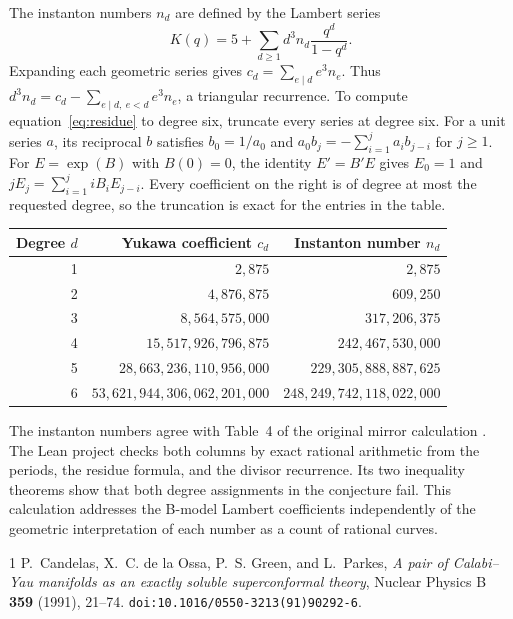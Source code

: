 \documentclass[11pt]{article}
\begin{document}
The instanton numbers \(n_d\) are defined by the Lambert series
\[
 K(q)=5+\sum_{d\ge1}d^3n_d\frac{q^d}{1-q^d}.
\]
Expanding each geometric series gives \(c_d=\sum_{e\mid d}e^3 n_e\).
Thus \(d^3n_d=c_d-\sum_{e\mid d,\ e<d}e^3n_e\), a triangular recurrence.
To compute equation~\eqref{eq:residue} to degree six, truncate every series
at degree six. For a unit series \(a\), its reciprocal \(b\) satisfies
\(b_0=1/a_0\) and \(a_0b_j=-\sum_{i=1}^j a_i b_{j-i}\) for \(j\ge1\).
For \(E=\exp(B)\) with \(B(0)=0\), the identity \(E'=B'E\) gives
\(E_0=1\) and \(jE_j=\sum_{i=1}^j iB_iE_{j-i}\). Every coefficient on
the right is of degree at most the requested degree, so the truncation is
exact for the entries in the table.

\begin{center}
\begin{tabular}{rrr}
\toprule
Degree \(d\) & Yukawa coefficient \(c_d\) & Instanton number \(n_d\) \\
\midrule
1 & \(2{,}875\) & \(2{,}875\) \\
2 & \(4{,}876{,}875\) & \(609{,}250\) \\
3 & \(8{,}564{,}575{,}000\) & \(317{,}206{,}375\) \\
4 & \(15{,}517{,}926{,}796{,}875\) & \(242{,}467{,}530{,}000\) \\
5 & \(28{,}663{,}236{,}110{,}956{,}000\) & \(229{,}305{,}888{,}887{,}625\) \\
6 & \(53{,}621{,}944{,}306{,}062{,}201{,}000\) & \(248{,}249{,}742{,}118{,}022{,}000\) \\
\bottomrule
\end{tabular}
\end{center}

The instanton numbers agree with Table~4 of the original mirror
calculation \cite{cogp}. The Lean project checks both columns by exact
rational arithmetic from the periods, the residue formula, and the divisor
recurrence. Its two inequality theorems show that both degree assignments
in the conjecture fail. This calculation addresses the B-model Lambert
coefficients independently of the geometric interpretation of each
number as a count of rational curves.

\begin{thebibliography}{1}
P.~Candelas, X.~C. de la Ossa, P.~S. Green, and L.~Parkes,
\emph{A pair of Calabi--Yau manifolds as an exactly soluble superconformal
theory}, Nuclear Physics B \textbf{359} (1991), 21--74.
\texttt{doi:10.1016/0550-3213(91)90292-6}.
\end{thebibliography}
\end{document}
